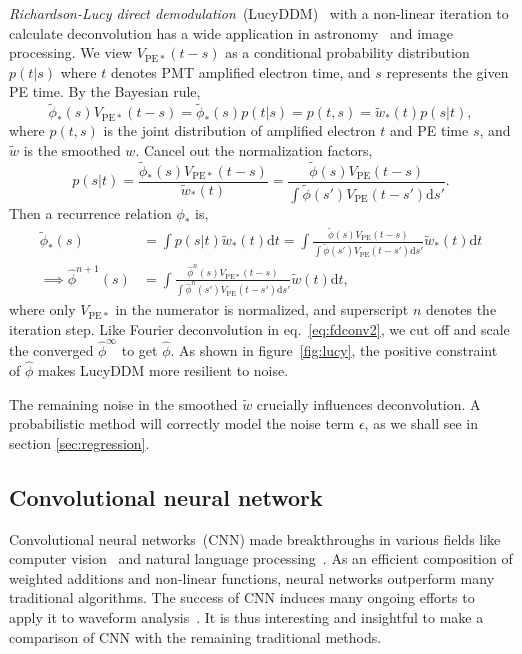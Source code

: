 \textit{Richardson-Lucy direct demodulation}~(LucyDDM)~\cite{lucy_iterative_1974} with a non-linear iteration to calculate deconvolution has a wide application in astronomy~\cite{li_richardson-lucy_2019} and image processing. We view $V_{\mathrm{PE}*}(t-s)$ as a conditional probability distribution $p(t|s)$ where $t$ denotes PMT amplified electron time, and $s$ represents the given PE time. By the Bayesian rule,
\begin{equation}
  \label{eq:lucy}
  \tilde{\phi}_*(s) V_{\mathrm{PE}*}(t-s) = \tilde{\phi}_*(s)p(t|s) = p(t,s) = \tilde{w}_*(t)p(s|t),
\end{equation}
where $p(t, s)$ is the joint distribution of amplified electron $t$ and PE time $s$, and $\tilde{w}$ is the smoothed $w$.  Cancel out the normalization factors,
\begin{equation}
  \label{eq:ptt}
  p(s|t) = \frac{\tilde{\phi}_*(s) V_{\mathrm{PE}*}(t-s)}{\tilde{w}_*(t)} = \frac{\tilde{\phi}(s) V_{\mathrm{PE}}(t-s)}{\int\tilde{\phi}(s') V_{\mathrm{PE}}(t-s')\mathrm{d}s'}.
\end{equation}
Then a recurrence relation $\phi_*$ is,
\begin{equation}
  \label{eq:iter}
  \begin{aligned}
    \tilde{\phi}_*(s) & = \int p(s|t) \tilde{w}_*(t)\mathrm{d}t = \int \frac{\tilde{\phi}(s) V_{\mathrm{PE}}(t-s)}{\int\tilde{\phi}(s') V_{\mathrm{PE}}(t-s')\mathrm{d}s'} \tilde{w}_*(t) \mathrm{d}t \\
    \implies \hat{\phi}^{n+1}(s) & = \int \frac{\hat{\phi}^n(s) V_{\mathrm{PE}*}(t-s)}{\int\hat{\phi}^n(s') V_{\mathrm{PE}}(t-s')\mathrm{d}s'} \tilde{w}(t) \mathrm{d}t,
  \end{aligned}
\end{equation}
where only $V_{\mathrm{PE}*}$ in the numerator is normalized, and superscript $n$ denotes the iteration step.
Like Fourier deconvolution in eq.~\eqref{eq:fdconv2}, we cut off and scale the converged $\hat{\phi}^\infty$ to get $\hat{\phi}$.  As shown in figure~\ref{fig:lucy}, the positive constraint of $\hat{\phi}$ makes LucyDDM more resilient to noise.

The remaining noise in the smoothed $\tilde{w}$ crucially influences deconvolution.  A probabilistic method will correctly model the noise term $\epsilon$, as we shall see in section \ref{sec:regression}.

\subsection{Convolutional neural network}
\label{sec:cnn}
Convolutional neural networks~(CNN) made breakthroughs in various fields like computer vision~\cite{he_deep_2016} and natural language processing~\cite{vaswani_attention_2017}.  As an efficient composition of weighted additions and non-linear functions, neural networks outperform many traditional algorithms.  The success of CNN induces many ongoing efforts to apply it to waveform analysis~\cite{students22}.  It is thus interesting and insightful to make a comparison of CNN with the remaining traditional methods.

